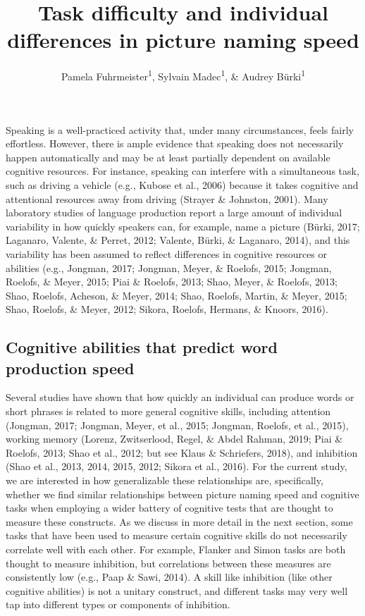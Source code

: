 \documentclass[
  man,floatsintext]{apa6}
\title{Task difficulty and individual differences in picture naming speed}
\author{Pamela Fuhrmeister\textsuperscript{1}, Sylvain Madec\textsuperscript{1}, \& Audrey Bürki\textsuperscript{1}}
\date{}
\affiliation{\vspace{0.5cm}\textsuperscript{1} University of Potsdam, Department of Linguistics}
\begin{document}
\maketitle

Speaking is a well-practiced activity that, under many circumstances, feels fairly effortless. However, there is ample evidence that speaking does not necessarily happen automatically and may be at least partially dependent on available cognitive resources. For instance, speaking can interfere with a simultaneous task, such as driving a vehicle (e.g., Kubose et al., 2006) because it takes cognitive and attentional resources away from driving (Strayer \& Johnston, 2001). Many laboratory studies of language production report a large amount of individual variability in how quickly speakers can, for example, name a picture (Bürki, 2017; Laganaro, Valente, \& Perret, 2012; Valente, Bürki, \& Laganaro, 2014), and this variability has been assumed to reflect differences in cognitive resources or abilities (e.g., Jongman, 2017; Jongman, Meyer, \& Roelofs, 2015; Jongman, Roelofs, \& Meyer, 2015; Piai \& Roelofs, 2013; Shao, Meyer, \& Roelofs, 2013; Shao, Roelofs, Acheson, \& Meyer, 2014; Shao, Roelofs, Martin, \& Meyer, 2015; Shao, Roelofs, \& Meyer, 2012; Sikora, Roelofs, Hermans, \& Knoors, 2016).

\hypertarget{cognitive-abilities-that-predict-word-production-speed}{%
\subsection{Cognitive abilities that predict word production speed}\label{cognitive-abilities-that-predict-word-production-speed}}

Several studies have shown that how quickly an individual can produce words or short phrases is related to more general cognitive skills, including attention (Jongman, 2017; Jongman, Meyer, et al., 2015; Jongman, Roelofs, et al., 2015), working memory (Lorenz, Zwitserlood, Regel, \& Abdel Rahman, 2019; Piai \& Roelofs, 2013; Shao et al., 2012; but see Klaus \& Schriefers, 2018), and inhibition (Shao et al., 2013, 2014, 2015, 2012; Sikora et al., 2016). For the current study, we are interested in how generalizable these relationships are, specifically, whether we find similar relationships between picture naming speed and cognitive tasks when employing a wider battery of cognitive tests that are thought to measure these constructs. As we discuss in more detail in the next section, some tasks that have been used to measure certain cognitive skills do not necessarily correlate well with each other. For example, Flanker and Simon tasks are both thought to measure inhibition, but correlations between these measures are consistently low (e.g., Paap \& Sawi, 2014). A skill like inhibition (like other cognitive abilities) is not a unitary construct, and different tasks may very well tap into different types or components of inhibition.
\end{document}
